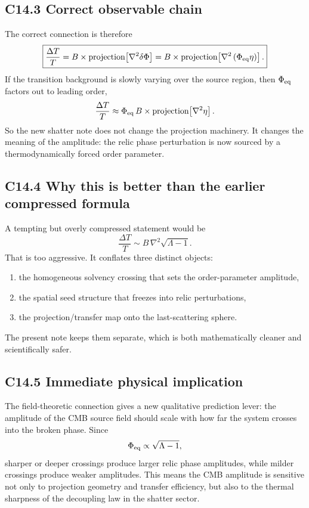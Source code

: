 \documentclass[11pt]{article}
\begin{document}
\subsection*{C14.3 Correct observable chain}
The correct connection is therefore
\begin{equation}
\boxed{\frac{\Delta T}{T}=B\times \mathrm{projection}\!\left[\nabla^2\delta\Phi\right]
= B\times \mathrm{projection}\!\left[\nabla^2\left(\Phi_{\rm eq}\eta\right)\right].}
\end{equation}
If the transition background is slowly varying over the source region, then $\Phi_{\rm eq}$ factors out to leading order,
\begin{equation}
\frac{\Delta T}{T}\approx \Phi_{\rm eq}\,B\times \mathrm{projection}\!\left[\nabla^2\eta\right].
\end{equation}
So the new shatter note does not change the projection machinery. It changes the meaning of the amplitude: the relic phase perturbation is now sourced by a thermodynamically forced order parameter.

\subsection*{C14.4 Why this is better than the earlier compressed formula}
A tempting but overly compressed statement would be
\begin{equation}
\frac{\Delta T}{T}\sim B\,\nabla^2\sqrt{\Lambda-1}.
\end{equation}
That is too aggressive. It conflates three distinct objects:
\begin{enumerate}[leftmargin=1.6em]
  \item the homogeneous solvency crossing that sets the order-parameter amplitude,
  \item the spatial seed structure that freezes into relic perturbations,
  \item the projection/transfer map onto the last-scattering sphere.
\end{enumerate}
The present note keeps them separate, which is both mathematically cleaner and scientifically safer.

\subsection*{C14.5 Immediate physical implication}
The field-theoretic connection gives a new qualitative prediction lever: the amplitude of the CMB source field should scale with how far the system crosses into the broken phase. Since
\begin{equation}
\Phi_{\rm eq}\propto \sqrt{\Lambda-1},
\end{equation}
sharper or deeper crossings produce larger relic phase amplitudes, while milder crossings produce weaker amplitudes. This means the CMB amplitude is sensitive not only to projection geometry and transfer efficiency, but also to the thermal sharpness of the decoupling law in the shatter sector.
\end{document}
